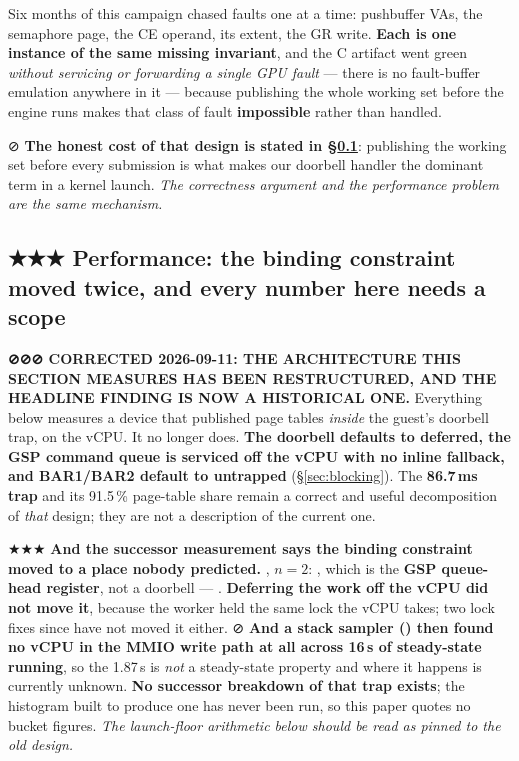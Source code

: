 \documentclass[10.5pt]{article}
\begin{document}
Six months of this campaign chased faults one at a time: pushbuffer VAs, the semaphore page, the
CE operand, its extent, the GR write. \textbf{Each is one instance of the same missing invariant},
and the C artifact went green \emph{without servicing or forwarding a single GPU fault} — there is
no fault-buffer emulation anywhere in it — because publishing the whole working set before the
engine runs makes that class of fault \textbf{impossible} rather than handled.

⊘ \textbf{The honest cost of that design is stated in \S\ref{sec:perf}}: publishing the working set
before every submission is what makes our doorbell handler the dominant term in a kernel launch.
\emph{The correctness argument and the performance problem are the same mechanism.}

\subsection{\texorpdfstring{★★★ Performance: the binding constraint moved twice, and every number here needs a scope}{Performance: the binding constraint moved twice}}
\label{sec:perf}

\begin{warnbox}\small
\textbf{⊘⊘⊘ CORRECTED 2026-09-11: THE ARCHITECTURE THIS SECTION MEASURES HAS BEEN
RESTRUCTURED, AND THE HEADLINE FINDING IS NOW A HISTORICAL ONE.} Everything below measures a
device that published page tables \emph{inside} the guest's doorbell trap, on the vCPU. It no
longer does. \textbf{The doorbell defaults to deferred, the GSP command queue is serviced off the
vCPU with no inline fallback, and BAR1/BAR2 default to untrapped} (\S\ref{sec:blocking}). The
\textbf{86.7\,ms trap} and its 91.5\,\% page-table share remain a correct and useful
\measured{} decomposition of \emph{that} design; they are not a description of the current one.

\smallskip
★★★ \textbf{And the successor measurement says the binding constraint moved to a place nobody
predicted.} \measured{} , $n=2$: , which is the \textbf{GSP queue-head register}, not a doorbell ---
. \textbf{Deferring the work off the vCPU did not move
it}, because the worker held the same lock the vCPU takes; two lock fixes since have not moved it
either. ⊘ \textbf{And a stack sampler () then found no vCPU in the MMIO write path at
all across 16\,s of steady-state running}, so the 1.87\,s is \emph{not} a steady-state property
and where it happens is currently unknown. \textbf{No successor breakdown of that trap exists};
the histogram built to produce one has never been run, so this paper quotes no bucket figures.
\emph{The launch-floor arithmetic below should be read as pinned to the old design.}
\end{warnbox}
\end{document}
